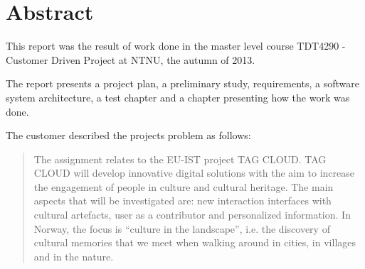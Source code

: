 \documentclass[11pt]{book}
\begin{document}
\begin{titlepage}
\begin{center}
        
        
                
        
    \end{center}
        
\end{titlepage}

\color{black}

\chapter{Abstract}
This report was the result of work done in the master level course TDT4290 - Customer Driven Project at NTNU, the autumn of 2013.

The report presents a project plan, a preliminary study, requirements, a software system architecture, a test chapter and a chapter presenting how the work was done.

The customer described the projects problem as follows:
\begin{quotation}\noindent
The assignment relates to the EU-IST project TAG CLOUD. TAG CLOUD will develop innovative digital solutions with the aim to increase the engagement of people in culture and cultural heritage. The main aspects that will be investigated are: new interaction interfaces with cultural artefacts, user as a contributor and personalized information. In Norway, the focus is ``culture in the landscape'', i.e. the discovery of cultural memories that we meet when walking around in cities, in villages and in the nature. \cite[p. 47]{compendium}
\end{quotation}
\end{document}
